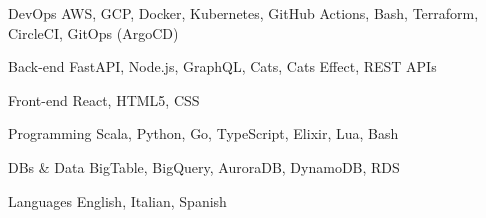 

\begin{cvskills}

  \cvskill
    {DevOps} %
    {AWS, GCP, Docker, Kubernetes, GitHub Actions, Bash, Terraform, CircleCI, GitOps (ArgoCD)} %

  \cvskill
    {Back-end} %
    {FastAPI, Node.js, GraphQL, Cats, Cats Effect, REST APIs} %

  \cvskill
    {Front-end} %
    {React, HTML5, CSS} %

  \cvskill
    {Programming} %
    {Scala, Python, Go, TypeScript, Elixir, Lua, Bash} %

  \cvskill
    {DBs \& Data} %
    {BigTable, BigQuery, AuroraDB, DynamoDB, RDS} %

  \cvskill
    {Languages} %
    {English, Italian, Spanish} %

\end{cvskills}
